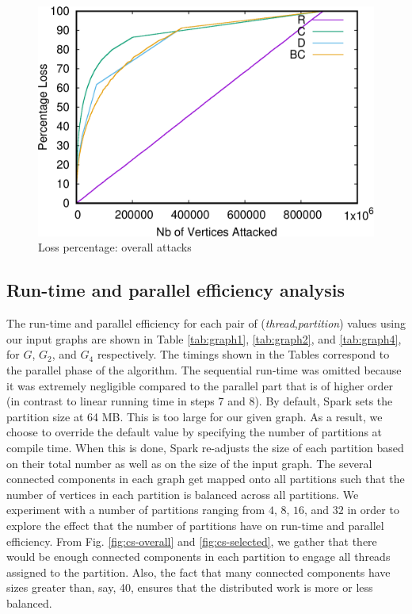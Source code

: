 \begin{figure}
\centering
\includegraphics[scale=0.35]{bench/loss-all-crop.pdf}
\caption{Loss percentage: overall attacks}
\label{fig:loss-all}
\end{figure}

\subsection{Run-time and parallel efficiency analysis}
The run-time and parallel efficiency for each pair of ({\it thread},{\it partition}) values using our input graphs are shown in Table \ref{tab:graph1}, \ref{tab:graph2}, and \ref{tab:graph4}, for $G$, $G_2$, and $G_4$ respectively. 
%
%
The timings shown in the Tables correspond to the parallel phase of the algorithm. The sequential run-time was omitted because it was extremely negligible compared to the parallel part that is of higher order (in contrast to linear running time in steps 7 and 8).
%
By default, Spark sets the partition size at 64 MB. This is too large for our given graph. As a result, we choose to override the default value by specifying the number of partitions at compile time. When this is done, Spark re-adjusts the size of each partition based on their total number as well as on the size of the input graph. The several connected components in each graph get mapped onto all partitions such that the number of vertices in each partition is balanced across all partitions. We experiment with a number of partitions ranging from $4$, $8$, $16$, and $32$ in order to explore the effect that the number of partitions have on run-time and parallel efficiency. From Fig. \ref{fig:cs-overall} and \ref{fig:cs-selected}, we gather that there would be enough connected components in each partition to engage all threads assigned to the partition. Also, the fact that many connected components have sizes greater than, say, 40, ensures that the distributed work is more or less balanced.


